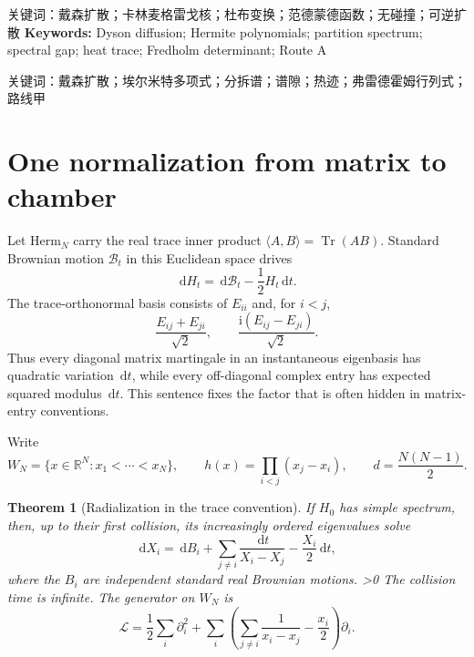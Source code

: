 \documentclass[10pt]{article}
\newcommand{\RR}{\mathbb R}
\newcommand{\dd}{\,\mathrm d}
\newcommand{\Tr}{\operatorname{Tr}}
\newtheorem{theorem}{Theorem}
\begin{document}
{\cjkfont\noindent 关键词：戴森扩散；卡林麦格雷戈核；杜布变换；范德蒙德函数；无碰撞；可逆扩散}
\else
\noindent\textbf{Keywords:} Dyson diffusion; Hermite polynomials; partition spectrum; spectral gap; heat trace; Fredholm determinant; Route A

{\cjkfont\noindent 关键词：戴森扩散；埃尔米特多项式；分拆谱；谱隙；热迹；弗雷德霍姆行列式；路线甲}
\fi

\section{One normalization from matrix to chamber}

Let $\mathrm{Herm}_N$ carry the real trace inner product
$\langle A,B\rangle=\Tr(AB)$.  Standard Brownian motion $\mathcal B_t$ in
this Euclidean space drives
\begin{equation}
 \dd H_t=\dd\mathcal B_t-\frac12H_t\dd t.       \label{eq:matrix-ou}
\end{equation}
The trace-orthonormal basis consists of $E_{ii}$ and, for $i<j$,
\begin{equation}
 \frac{E_{ij}+E_{ji}}{\sqrt2},\qquad
 \frac{\mathrm i(E_{ij}-E_{ji})}{\sqrt2}.      \label{eq:trace-basis}
\end{equation}
Thus every diagonal matrix martingale in an instantaneous eigenbasis has
quadratic variation $\dd t$, while every off-diagonal complex entry has
expected squared modulus $\dd t$.  This sentence fixes the factor that is
often hidden in matrix-entry conventions.

Write
\begin{equation}
 W_N=\{x\in\RR^N:x_1<\cdots<x_N\},\qquad
 h(x)=\prod_{i<j}(x_j-x_i),\qquad d=\frac{N(N-1)}2.   \label{eq:chamber}
\end{equation}

\begin{theorem}[Radialization in the trace convention]
If $H_0$ has simple spectrum, then, up to their first collision, its
increasingly ordered eigenvalues solve
\begin{equation}
 \dd X_i=\dd B_i+\sum_{j\ne i}\frac{\dd t}{X_i-X_j}
             -\frac{X_i}{2}\dd t,                  \label{eq:dyson-sde}
\end{equation}
where the $B_i$ are independent standard real Brownian motions.
\ifnum\CRevisionRound>0
The collision time is infinite.
\fi
The generator on $W_N$ is
\begin{equation}
 \mathcal L=\frac12\sum_i\partial_i^2+
 \sum_i\left(\sum_{j\ne i}\frac1{x_i-x_j}-\frac{x_i}{2}\right)\partial_i.
                                                        \label{eq:generator}
\end{equation}
\end{theorem}
\end{document}
